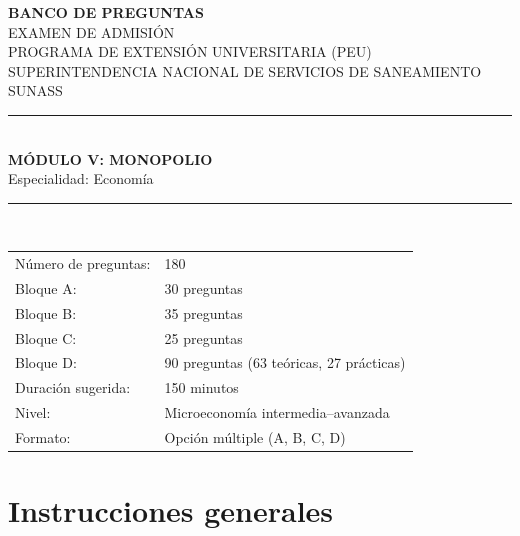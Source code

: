 \documentclass[11pt,a4paper]{article}
\begin{document}
\begin{titlepage}
\thispagestyle{empty}
\centering
\backboneportadaheader

{\Large\bfseries BANCO DE PREGUNTAS}\\[0.35cm]
{\large EXAMEN DE ADMISIÓN}\\[0.15cm]
{\large PROGRAMA DE EXTENSIÓN UNIVERSITARIA (PEU)}\\[0.15cm]
{\large SUPERINTENDENCIA NACIONAL DE SERVICIOS DE SANEAMIENTO}\\[0.05cm]
{\large SUNASS}\\[1.0cm]

\rule{\linewidth}{0.9pt}\\[0.55cm]
{\LARGE\bfseries MÓDULO V: MONOPOLIO}\\[0.35cm]
{\large Especialidad: Economía}\\[0.55cm]
\rule{\linewidth}{0.9pt}\\[1.0cm]

\begin{tabular}{ll}
\toprule
Número de preguntas: & 180 \\
Bloque A: & 30 preguntas \\
Bloque B: & 35 preguntas \\
Bloque C: & 25 preguntas \\
Bloque D: & 90 preguntas (63 teóricas, 27 prácticas) \\
Duración sugerida: & 150 minutos \\
Nivel: & Microeconomía intermedia--avanzada \\
Formato: & Opción múltiple (A, B, C, D) \\
\bottomrule
\end{tabular}

\vfill
\backboneportadafooter
\end{titlepage}

\section*{Instrucciones generales}
\end{document}
